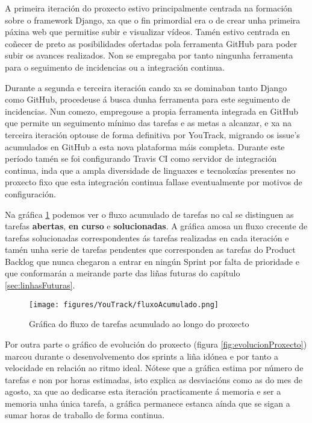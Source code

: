A primeira iteración do proxecto estivo principalmente centrada na formación sobre o framework
Django, xa que o fin primordial era o de crear unha primeira páxina web que permitise subir e 
visualizar vídeos. Tamén estivo centrada en coñecer de preto as posibilidades ofertadas pola
ferramenta GitHub para poder subir os avances realizados. Non se empregaba por tanto ningunha
ferramenta para o seguimento de incidencias ou a integración continua.

Durante a segunda e terceira iteración cando xa se dominaban tanto Django como GitHub, 
procedeuse á busca dunha ferramenta para este seguimento de incidencias. Nun comezo, empregouse
a propia ferramenta integrada en GitHub que permite un seguimento mínimo das tarefas e as metas
a alcanzar, e xa na terceira iteración optouse de forma definitiva por YouTrack, migrando os 
issue's acumulados en GitHub a esta nova plataforma máis completa. Durante este período tamén se
foi configurando Travis CI como servidor de integración continua, inda que a ampla diversidade
de linguaxes e tecnoloxías presentes no proxecto fixo que esta integración continua fallase 
eventualmente por motivos de configuración.


Na gráfica \ref{fig:fluxoAcumulado} podemos ver o fluxo acumulado de tarefas no cal se distinguen
as tarefas \textbf{abertas}, \textbf{en curso} e \textbf{solucionadas}. A gráfica amosa un fluxo 
crecente de tarefas solucionadas correspondentes ás tarefas realizadas en cada iteración e tamén 
unha serie de tarefas pendentes que corresponden as tarefas do Product Backlog que nunca chegaron
a entrar en ningún Sprint por falta de prioridade e que conformarán a meirande parte das liñas 
futuras do capítulo \ref{sec:linhasFuturas}.

\begin{figure}[htp]
\begin{center}
    \texttt{[image: figures/YouTrack/fluxoAcumulado.png]}
    \caption{Gráfica do fluxo de tarefas acumulado ao longo do proxecto}
\label{fig:fluxoAcumulado}
\end{center}
\end{figure}

Por outra parte o gráfico de evolución do proxecto (figura \ref{fig:evolucionProxecto}) marcou 
durante o desenvolvemento dos sprints a liña idónea e por tanto a velocidade en relación ao ritmo
ideal. Nótese que a gráfica estima por número de tarefas e non por horas estimadas, isto 
explica as desviacións como as do mes de agosto, xa que ao dedicarse esta iteración practicamente á
memoria e ser a memoria unha única tarefa, a gráfica permanece estanca aínda que se sigan a sumar
horas de traballo de forma continua.

